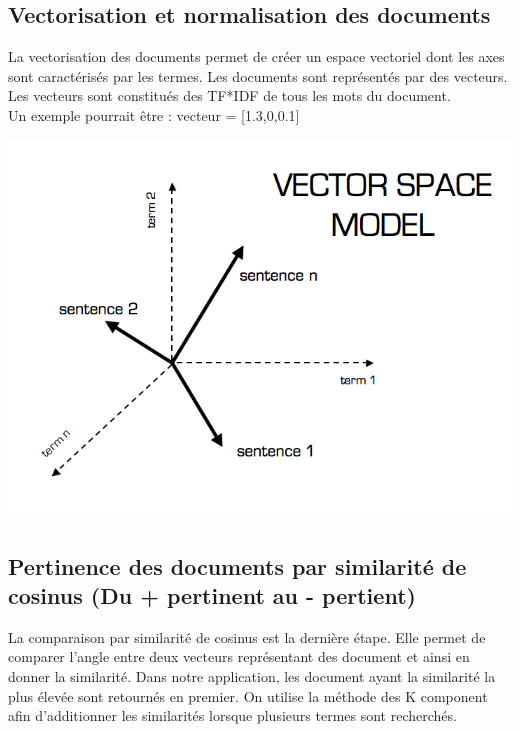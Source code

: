 \documentclass[11pt]{article}
\begin{document}
\subsection{Vectorisation et normalisation des documents}
La vectorisation des documents permet de créer un espace vectoriel dont les axes sont caractérisés par les termes. Les documents sont représentés par des vecteurs.  \\
Les vecteurs sont constitués des TF*IDF de tous les mots du document. \\
Un exemple pourrait être : vecteur = [1.3,0,0.1]
\begin{center}
\includegraphics[scale=0.45]{vector_space}
\end{center}
\pagebreak
\subsection{Pertinence des documents par similarité de cosinus (Du + pertinent au - pertient)}
La comparaison par similarité de cosinus est la dernière étape. Elle permet de comparer l'angle entre deux vecteurs représentant des document et ainsi en donner la similarité. Dans notre application, les document ayant la similarité la plus élevée sont retournés en premier. On utilise la méthode des K component afin d'additionner les similarités lorsque plusieurs termes sont recherchés. 
\end{document}

